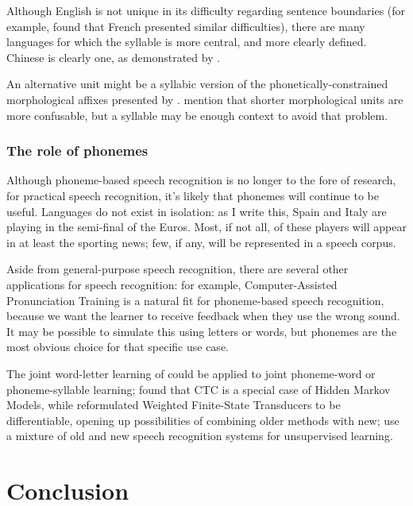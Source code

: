 \documentclass{article}[11pt]
\begin{document}
Although English is not unique in its difficulty regarding sentence boundaries (for example, \citet{goslin_comparing_2007} found that French presented similar difficulties), there are many languages for which the syllable is more central, and more clearly defined. Chinese is clearly one, as demonstrated by \citet{dong_cif_2020}.

An alternative unit might be a syllabic version of the phonetically-constrained morphological affixes presented by \citet{huckvale_using_2002}. \citet{tachbelie_morpheme-based_2010} mention that shorter morphological units are more confusable, but a syllable may be enough context to avoid that problem.

\subsubsection{The role of phonemes}

Although phoneme-based speech recognition is no longer to the fore of research, for practical speech recognition, it's likely that phonemes will continue to be useful. Languages do not exist in isolation: as I write this, Spain and Italy are playing in the semi-final of the Euros. Most, if not all, of these players will appear in at least the sporting news; few, if any, will be represented in a speech corpus.

Aside from general-purpose speech recognition, there are several other applications for speech recognition: for example, Computer-Assisted Pronunciation Training is a natural fit for phoneme-based speech recognition, because we want the learner to receive feedback when they use the wrong sound. It may be possible to simulate this using letters or words, but phonemes are the most obvious choice for that specific use case.

The joint word-letter learning of \citet{li_acoustic--word_2017} could be applied to joint phoneme-word or phoneme-syllable learning; \citet{zeyer_ctc_2017} found that CTC is a special case of Hidden Markov Models, while \citet{hannun_differentiable_2020} reformulated Weighted Finite-State Transducers to be differentiable, opening up possibilities of combining older methods with new; \citet{baevski_unsupervised_2021} use a mixture of old and new speech recognition systems for unsupervised learning.

\section{Conclusion}
\end{document}
